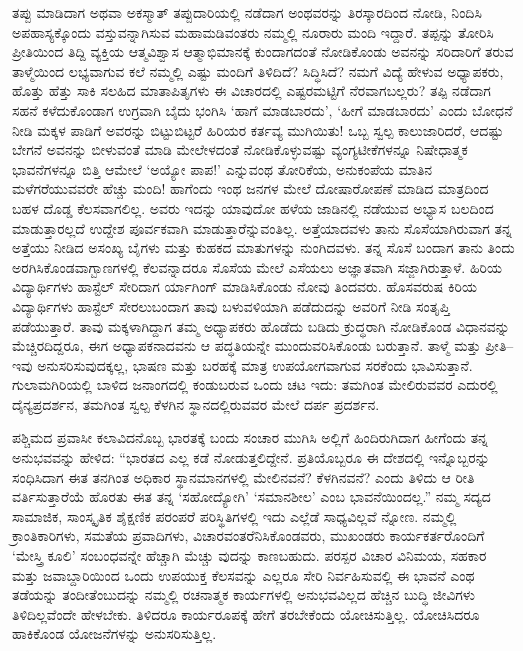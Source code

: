 
ತಪ್ಪು ಮಾಡಿದಾಗ ಅಥವಾ ಅಕಸ್ಮಾತ್ ತಪ್ಪುದಾರಿಯಲ್ಲಿ ನಡೆದಾಗ ಅಂಥವರನ್ನು ತಿರಸ್ಕಾರದಿಂದ ನೋಡಿ, ನಿಂದಿಸಿ ಅಪಹಾಸ್ಯಕ್ಕೊಂದು ವಸ್ತುವನ್ನಾಗಿಸುವ ಮಹಾಮಡಿವಂತರು ನಮ್ಮಲ್ಲಿ ನೂರಾರು ಮಂದಿ ಇದ್ದಾರೆ. ತಪ್ಪನ್ನು ತೋರಿಸಿ ಪ್ರೀತಿಯಿಂದ ತಿದ್ದಿ ವ್ಯಕ್ತಿಯ ಆತ್ಮವಿಶ್ವಾಸ ಆತ್ಮಾಭಿಮಾನಕ್ಕೆ ಕುಂದಾಗದಂತೆ ನೋಡಿಕೊಂಡು ಅವನನ್ನು ಸರಿದಾರಿಗೆ ತರುವ ತಾಳ್ಮೆಯಿಂದ ಲಭ್ಯವಾಗುವ ಕಲೆ ನಮ್ಮಲ್ಲಿ ಎಷ್ಟು ಮಂದಿಗೆ ತಿಳಿದಿದೆ? ಸಿದ್ಧಿಸಿದೆ? ನಮಗೆ ವಿದ್ಯೆ ಹೇಳುವ ಅಧ್ಯಾಪಕರು, ಹೊತ್ತು ಹೆತ್ತು ಸಾಕಿ ಸಲಹಿದ ಮಾತಾಪಿತೃಗಳು ಈ ವಿಚಾರದಲ್ಲಿ ಎಷ್ಟರಮಟ್ಟಿಗೆ ನೆರವಾಗಬಲ್ಲರು? ತಪ್ಪಿ ನಡೆದಾಗ ಸಹನೆ ಕಳೆದುಕೊಂಡಾಗ ಉಗ್ರವಾಗಿ ಬೈದು ಭಂಗಿಸಿ ‘ಹಾಗೆ ಮಾಡಬಾರದು’, ‘ಹೀಗೆ ಮಾಡಬಾರದು’ ಎಂದು ಬೋಧನೆ ನೀಡಿ ಮಕ್ಕಳ ಪಾಡಿಗೆ ಅವರನ್ನು ಬಿಟ್ಟುಬಿಟ್ಟರೆ ಹಿರಿಯರ ಕರ್ತವ್ಯ ಮುಗಿಯಿತು! ಒಬ್ಬ ಸ್ವಲ್ಪ ಕಾಲುಜಾರಿದರೆ, ಆದಷ್ಟು ಬೇಗನೆ ಅವನನ್ನು ಬೀಳುವಂತೆ ಮಾಡಿ ಮೇಲೇಳದಂತೆ ನೋಡಿಕೊಳ್ಳುವಷ್ಟು ವ್ಯಂಗ್ಯಟೀಕೆಗಳನ್ನೂ ನಿಷೇಧಾತ್ಮಕ ಭಾವನೆಗಳನ್ನೂ ಬಿತ್ತಿ ಆಮೇಲೆ ‘ಅಯ್ಯೋ ಪಾಪ!’ ಎನ್ನುವಂಥ ತೋರಿಕೆಯ, ಅನುಕಂಪೆಯ ಮಾತಿನ ಮಳೆಗರೆಯುವವರೇ ಹೆಚ್ಚು ಮಂದಿ! ಹಾಗೆಂದು ಇಂಥ ಜನಗಳ ಮೇಲೆ ದೋಷಾರೋಪಣೆ ಮಾಡಿದ ಮಾತ್ರದಿಂದ ಬಹಳ ದೊಡ್ಡ ಕೆಲಸವಾಗಲಿಲ್ಲ. ಅವರು ಇದನ್ನು ಯಾವುದೋ ಹಳೆಯ ಜಾಡಿನಲ್ಲಿ ನಡೆಯುವ ಅಭ್ಯಾಸ ಬಲದಿಂದ ಮಾಡುತ್ತಾರಲ್ಲದೆ ಉದ್ದೇಶ ಪೂರ್ವಕವಾಗಿ ಮಾಡುತ್ತಾರೆನ್ನುವಂತಿಲ್ಲ. ಅತ್ತೆಯಾದವಳು ತಾನು ಸೊಸೆಯಾಗಿರುವಾಗ ತನ್ನ ಅತ್ತೆಯು ನೀಡಿದ ಅಸಂಖ್ಯ ಬೈಗಳು ಮತ್ತು ಕುಹಕದ ಮಾತುಗಳನ್ನು ನುಂಗಿದವಳು. ತನ್ನ ಸೊಸೆ ಬಂದಾಗ ತಾನು ತಿಂದು ಅರಗಿಸಿಕೊಂಡವಾಗ್ಬಾಣಗಳಲ್ಲಿ ಕೆಲವನ್ನಾದರೂ ಸೊಸೆಯ ಮೇಲೆ ಎಸೆಯಲು ಅಜ್ಞಾತವಾಗಿ ಸಜ್ಜಾಗಿರುತ್ತಾಳೆ. ಹಿರಿಯ ವಿದ್ಯಾರ್ಥಿಗಳು ಹಾಸ್ಟೆಲ್ ಸೇರಿದಾಗ ರ್ಯಾಗಿಂಗ್ ಮಾಡಿಸಿಕೊಂಡು ನೋವು ತಿಂದವರು. ಹೊಸವರುಷ ಕಿರಿಯ ವಿದ್ಯಾರ್ಥಿಗಳು ಹಾಸ್ಟೆಲ್ ಸೇರಲು\break ಬಂದಾಗ ತಾವು ಬಳುವಳಿಯಾಗಿ ಪಡೆದುದನ್ನು ಅವರಿಗೆ ನೀಡಿ ಸಂತೃಪ್ತಿ ಪಡೆಯುತ್ತಾರೆ. ತಾವು ಮಕ್ಕಳಾಗಿದ್ದಾಗ ತಮ್ಮ ಅಧ್ಯಾಪಕರು ಹೊಡೆದು ಬಡಿದು ಕ್ರುದ್ಧರಾಗಿ ನೋಡಿಕೊಂಡ ವಿಧಾನವನ್ನು ಮೆಚ್ಚಿರದಿದ್ದರೂ, ಈಗ ಅಧ್ಯಾಪಕನಾದವನು ಆ ಪದ್ಧತಿಯನ್ನೇ ಮುಂದುವರಿಸಿಕೊಂಡು ಬರುತ್ತಾನೆ. ತಾಳ್ಮೆ ಮತ್ತು ಪ್ರೀತಿ–ಇವು ಅನುಸರಿಸುವುದಕ್ಕಲ್ಲ, ಭಾಷಣ ಮತ್ತು ಬರಹಕ್ಕೆ ಮಾತ್ರ ಉಪಯೋಗವಾಗುವ ಸರಕೆಂದು ಭಾವಿಸುತ್ತಾನೆ. ಗುಲಾಮಗಿರಿಯಲ್ಲಿ ಬಾಳಿದ ಜನಾಂಗದಲ್ಲಿ ಕಂಡುಬರುವ ಒಂದು ಚಟ ಇದು: ತಮಗಿಂತ ಮೇಲಿರುವವರ ಎದುರಲ್ಲಿ ದೈನ್ಯಪ್ರದರ್ಶನ, ತಮಗಿಂತ ಸ್ವಲ್ಪ ಕೆಳಗಿನ ಸ್ಥಾನದಲ್ಲಿರುವವರ ಮೇಲೆ ದರ್ಪ ಪ್ರದರ್ಶನ.

ಪಶ್ಚಿಮದ ಪ್ರವಾಸೀ ಕಲಾವಿದನೊಬ್ಬ ಭಾರತಕ್ಕೆ ಬಂದು ಸಂಚಾರ ಮುಗಿಸಿ ಅಲ್ಲಿಗೆ ಹಿಂದಿರುಗಿದಾಗ ಹೀಗೆಂದು ತನ್ನ ಅನುಭವವನ್ನು ಹೇಳಿದ: “ಭಾರತದ ಎಲ್ಲ ಕಡೆ ನೋಡುತ್ತಲಿದ್ದೇನೆ. ಪ್ರತಿಯೊಬ್ಬರೂ ಈ ದೇಶದಲ್ಲಿ ಇನ್ನೊಬ್ಬರನ್ನು ಸಂಧಿಸಿದಾಗ ಈತ ತನಗಿಂತ ಅಧಿಕಾರ ಸ್ಥಾನಮಾನಗಳಲ್ಲಿ ಮೇಲಿನವನೆ? ಕೆಳಗಿನವನೆ? ಎಂದು ತಿಳಿದು ಆ ರೀತಿ ವರ್ತಿಸುತ್ತಾರೆಯೆ ಹೊರತು ಈತ ತನ್ನ ‘ಸಹೋದ್ಯೋಗಿ’ ‘ಸಮಾನಶೀಲ’ ಎಂಬ ಭಾವನೆಯಿಂದಲ್ಲ.” ನಮ್ಮ ಸದ್ಯದ ಸಾಮಾಜಿಕ, ಸಾಂಸ್ಕೃತಿಕ ಶೈಕ್ಷಣಿಕ ಪರಂಪರೆ ಪರಿಸ್ಥಿತಿಗಳಲ್ಲಿ ಇದು ಎಲ್ಲೆಡೆ ಸಾಧ್ಯವಿಲ್ಲವೆ ನ್ನೋಣ. ನಮ್ಮಲ್ಲಿ ಕ್ರಾಂತಿಕಾರಿಗಳು, ಸಮತೆಯ ಪ್ರವಾದಿಗಳು, ವಿಚಾರವಂತರೆನಿಸಿಕೊಂಡವರು, ಮುಖಂಡರು ಕಾರ್ಯಕರ್ತರೊಂದಿಗೆ ‘ಮೇಸ್ತ್ರಿ ಕೂಲಿ’ ಸಂಬಂಧವನ್ನೇ ಹೆಚ್ಚಾಗಿ ಮೆಚ್ಚು ವುದನ್ನು ಕಾಣಬಹುದು. ಪರಸ್ಪರ ವಿಚಾರ ವಿನಿಮಯ, ಸಹಕಾರ ಮತ್ತು ಜವಾಬ್ದಾರಿಯಿಂದ ಒಂದು ಉಪಯುಕ್ತ ಕೆಲಸವನ್ನು ಎಲ್ಲರೂ ಸೇರಿ ನಿರ್ವಹಿಸುವಲ್ಲಿ ಈ ಭಾವನೆ ಎಂಥ ತಡೆಯನ್ನು ತಂದೀತೆಂಬುದನ್ನು ನಮ್ಮಲ್ಲಿ ರಚನಾತ್ಮಕ ಕಾರ್ಯಗಳಲ್ಲಿ ಅನುಭವವಿಲ್ಲದ ಹೆಚ್ಚಿನ ಬುದ್ಧಿ ಜೀವಿಗಳು ತಿಳಿದಿಲ್ಲವೆಂದೇ ಹೇಳಬೇಕು. ತಿಳಿದರೂ ಕಾರ್ಯರೂಪಕ್ಕೆ ಹೇಗೆ ತರಬೇಕೆಂದು ಯೋಚಿಸುತ್ತಿಲ್ಲ. ಯೋಚಿಸಿದರೂ ಹಾಕಿಕೊಂಡ ಯೋಜನೆಗಳನ್ನು ಅನುಸರಿಸುತ್ತಿಲ್ಲ.


